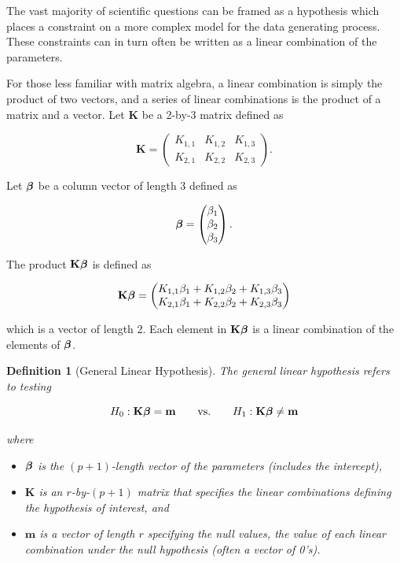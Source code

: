 \documentclass[
]{book}
\providecommand{\tightlist}{%
  \setlength{\itemsep}{0pt}\setlength{\parskip}{0pt}}
\theoremstyle{plain}
\theoremstyle{mydefn}
\newtheorem{definition}{Definition}[chapter]
\theoremstyle{myexmpl}
\theoremstyle{remark}
\begin{document}
The vast majority of scientific questions can be framed as a hypothesis which places a constraint on a more complex model for the data generating process. These constraints can in turn often be written as a linear combination of the parameters.

\begin{rmdtip}
For those less familiar with matrix algebra, a linear combination is simply the product of two vectors, and a series of linear combinations is the product of a matrix and a vector. Let \(\bm{K}\) be a 2-by-3 matrix defined as

\[\bm{K} = \begin{pmatrix} 
   K_{1,1} & K_{1,2} & K_{1,3} \\
   K_{2,1} & K_{2,2} & K_{2,3} \end{pmatrix}.\]

Let \(\boldsymbol{\beta}\) be a column vector of length 3 defined as

\[\boldsymbol{\beta} = \begin{pmatrix}
   \beta_1 \\
   \beta_2 \\
   \beta_3 \end{pmatrix}.\]

The product \(\mathbf{K} \boldsymbol{\beta}\) is defined as

\[\mathbf{K}\boldsymbol{\beta} = \begin{pmatrix}
   K_{1,1} \beta_1 + K_{1,2} \beta_2 + K_{1,3} \beta_3 \\
   K_{2,1} \beta_1 + K_{2,2} \beta_2 + K_{2,3} \beta_3 \end{pmatrix}\]

which is a vector of length 2. Each element in \(\mathbf{K}\boldsymbol{\beta}\) is a linear combination of the elements of \(\boldsymbol{\beta}\).
\end{rmdtip}

\begin{definition}[General Linear Hypothesis]
\protect\hypertarget{def:defn-general-linear-hypothesis}{}{\label{def:defn-general-linear-hypothesis} {} }The general linear hypothesis refers to testing

\[H_0: \mathbf{K}\boldsymbol{\beta} = \mathbf{m} \qquad \text{vs.} \qquad H_1: \mathbf{K}\boldsymbol{\beta} \neq \mathbf{m}\]

where

\begin{itemize}
\tightlist
\item
  \(\boldsymbol{\beta}\) is the \((p+1)\)-length vector of the parameters (includes the intercept),
\item
  \(\bm{K}\) is an \(r\)-by-\((p+1)\) matrix that specifies the linear combinations defining the hypothesis of interest, and
\item
  \(\bm{m}\) is a vector of length \(r\) specifying the null values, the value of each linear combination under the null hypothesis (often a vector of 0's).
\end{itemize}
\end{definition}
\end{document}
